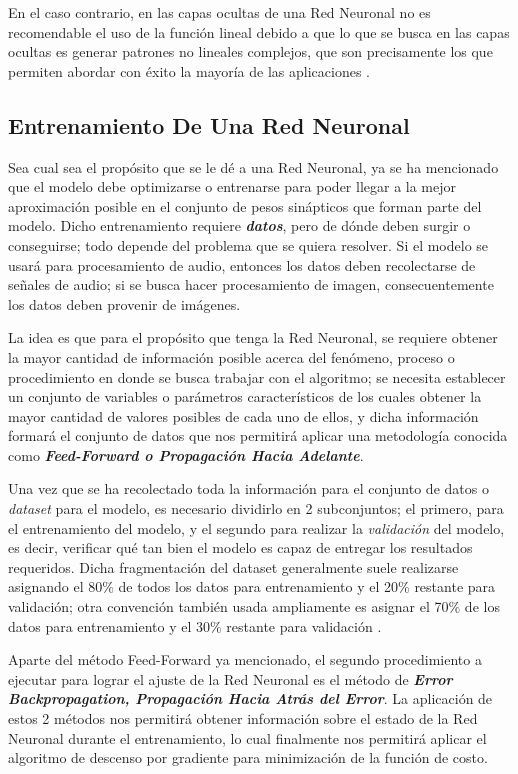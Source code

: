 {En el caso contrario, en las capas ocultas de una Red Neuronal no es recomendable el uso de la función lineal debido a que lo que se busca en las capas ocultas es generar patrones no lineales complejos, que son precisamente 
los que permiten abordar con éxito la mayoría de las aplicaciones \cite{RNAconceptosBasicos}.

\subsection{Entrenamiento De Una Red Neuronal}

Sea cual sea el propósito que se le dé a una Red Neuronal, ya se ha mencionado que el modelo debe optimizarse o entrenarse para poder llegar a la mejor aproximación posible en el conjunto de pesos sinápticos que forman parte 
del modelo. Dicho entrenamiento requiere \textbf{\textit{datos}}, pero de dónde deben surgir o conseguirse; todo depende del problema que se quiera resolver. Si el modelo se usará para procesamiento de audio, entonces los 
datos deben recolectarse de señales de audio; si se busca hacer procesamiento de imagen, consecuentemente los datos deben provenir de imágenes.

La idea es que para el propósito que tenga la Red Neuronal, se requiere obtener la mayor cantidad de información posible acerca del fenómeno, proceso o procedimiento en donde se busca trabajar con el algoritmo; se necesita 
establecer un conjunto de variables o parámetros característicos de los cuales obtener la mayor cantidad de valores posibles de cada uno de ellos, y dicha información formará el conjunto de datos que nos permitirá aplicar 
una metodología conocida como \textbf{\textit{Feed-Forward o Propagación Hacia Adelante}}. 

Una vez que se ha recolectado toda la información para el conjunto de datos o \textit{dataset} para el modelo, es necesario dividirlo en 2 subconjuntos; el primero, para el entrenamiento del modelo, y el segundo para realizar 
la \textit{validación} del modelo, es decir, verificar qué tan bien el modelo es capaz de entregar los resultados requeridos. Dicha fragmentación del dataset generalmente suele realizarse asignando el 80$\%$ de todos los 
datos para entrenamiento y el 20$\%$ restante para validación; otra convención también usada ampliamente es asignar el 70$\%$ de los datos para entrenamiento y el 30$\%$ restante para validación \cite{caicedoANN}.

Aparte del método Feed-Forward ya mencionado, el segundo procedimiento a ejecutar para lograr el ajuste de la Red Neuronal es el método de \textbf{\textit{Error Backpropagation, Propagación Hacia Atrás del Error}}. La aplicación
de estos 2 métodos nos permitirá obtener información sobre el estado de la Red Neuronal durante el entrenamiento, lo cual finalmente nos permitirá aplicar el algoritmo de descenso por gradiente para minimización de la función 
de costo.

}
